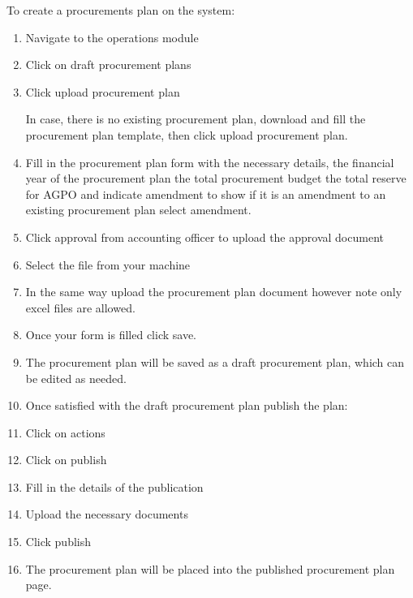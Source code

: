 \documentclass [12pt]{book}
\begin{document}
To create a procurements plan on the system:
\begin{enumerate}
\item Navigate to the operations module 
\item Click on draft procurement plans 
\item Click upload procurement plan 


In case, there is no existing procurement plan, download and fill the procurement plan template, then click upload procurement plan.

\item Fill in the procurement plan form with the necessary details, the financial year of the procurement plan the total procurement budget the total reserve for AGPO and indicate amendment to show if it is an amendment to an existing procurement plan select amendment.

\item Click approval from accounting officer to upload the approval document  
\item Select the file from your machine
\item In the same way upload the procurement plan document however note only excel files are allowed.
\item Once your form is filled click save.
\item The procurement plan will be saved as a draft procurement plan, which can be edited as needed.
\item Once satisfied with the draft procurement plan publish the plan: 
\item Click on actions 
\item Click on publish 
\item Fill in the details of the publication
\item Upload the necessary documents 
\item Click publish
\item The procurement plan will be placed into the published procurement plan page.
\end{enumerate}
\end{document}
